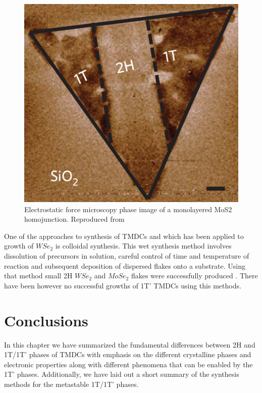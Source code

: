\begin{figure}[!h]
	\begin{center}
		\includegraphics[scale=0.25]{1T'/Homojunction.png}
		\caption{Electrostatic force microscopy phase image of a monolayered MoS2 homojunction. Reproduced from \cite{Kappera2014}}
		\label{fig:1T'Homojunction}
	\end{center}
\end{figure}

One of the approaches to synthesis of TMDCs and which has been applied to growth of $WSe_2$ is colloidal synthesis. This wet synthesis method involves dissolution of precursors in solution, careful control of time and temperature of reaction and subsequent deposition of dispersed flakes onto a substrate. Using that method small 2H $WSe_2$ and $MoSe_2$ flakes were successfully produced \cite{Barrera2017}\cite{Jung2015}. There have been however no successful growths of 1T' TMDCs using this methods.

\section{Conclusions}

In this chapter we have summarized the fundamental differences between 2H and 1T/1T’ phases of TMDCs with emphasis on the different crystalline phases and electronic properties along with different phenomena that can be enabled by the 1T’ phases. Additionally, we have laid out a short summary of the synthesis methods for the metastable 1T/1T’ phases.